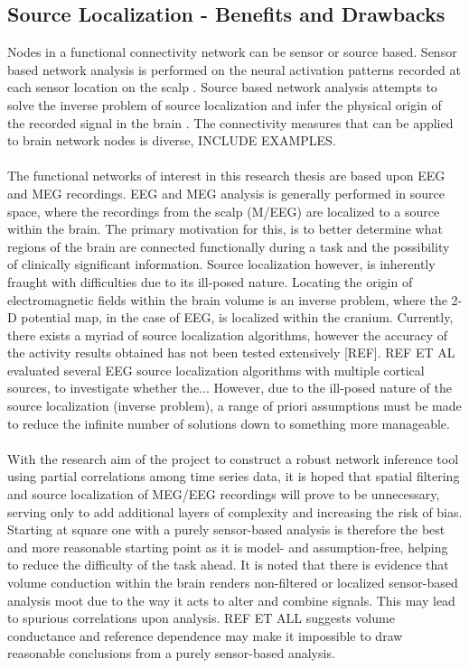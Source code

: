 \documentclass[11pt]{article}
\begin{document}
\subsection{Source Localization - Benefits and Drawbacks}
Nodes in a functional connectivity network can be sensor or source based. Sensor based network analysis is performed on the neural activation patterns recorded at each sensor location on the scalp \citep{fornito2013graph}. Source based network analysis attempts to solve the inverse problem of source localization and infer the physical origin of the recorded signal in the brain \citep{revbull}. The connectivity measures that can be applied to brain network nodes is diverse, INCLUDE EXAMPLES\citet{fornito2013graph}.\\
\\
The functional networks of interest in this research thesis are based upon EEG and MEG recordings. EEG and MEG analysis is generally performed in source space, where the recordings from the scalp (M/EEG) are localized to a source within the brain. The primary motivation for this, is to better determine what regions of the brain are connected functionally during a task and the possibility of clinically significant information. Source localization however, is inherently fraught with difficulties due to its ill-posed nature. Locating the origin of electromagnetic fields within the brain volume is an inverse problem, where the 2-D potential map, in the case of EEG, is localized within the cranium. Currently, there exists a myriad of source localization algorithms, however the accuracy of the activity results obtained has not been tested extensively [REF].  REF ET AL evaluated several EEG source localization algorithms with multiple cortical sources, to investigate whether the...  However, due to the ill-posed nature of the source localization (inverse problem), a range of priori assumptions must be made to reduce the infinite number of solutions down to something more manageable.\\
\\
With the research aim of the project to construct a robust network inference tool using partial correlations among time series data, it is hoped that spatial filtering and source localization of MEG/EEG recordings will prove to be unnecessary, serving only to add additional layers of complexity and increasing the risk of bias. Starting at square one with a purely sensor-based analysis is therefore the best and more reasonable starting point as it is model- and assumption-free, helping to reduce the difficulty of the task ahead. It is noted that there is evidence that volume conduction within the brain renders non-filtered or localized sensor-based analysis moot due to the way it acts to alter and combine signals. This may lead to spurious correlations upon analysis. REF ET ALL suggests volume conductance and reference dependence may make it impossible to draw reasonable conclusions from a purely sensor-based analysis.\\
\end{document}
